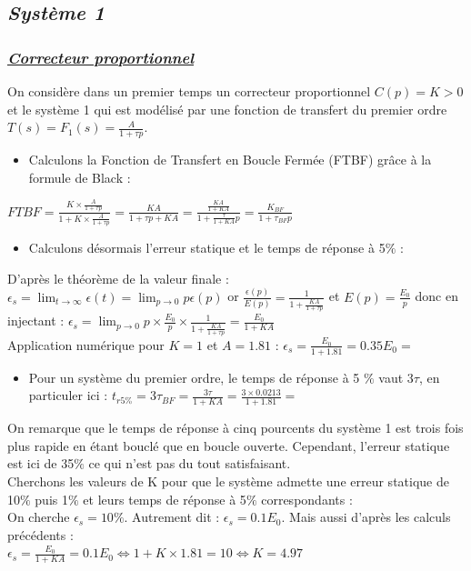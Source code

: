 \documentclass[12pt]{article}
\begin{document}
\subsection{\itshape Système 1}
\subsubsection{\underline{\itshape \bf Correcteur proportionnel}}
On considère dans un premier temps un correcteur proportionnel $C(p) = K > 0$ et le système 1 qui est modélisé par une fonction de transfert du premier ordre $T(s) = F_1(s) = \frac{A}{1 + \tau p}$.
\\
\begin{itemize}
    \item Calculons la Fonction de Transfert en Boucle Fermée (FTBF) grâce à la formule de Black : 
\end{itemize}

\large $FTBF = \frac{K\times \frac{A}{1 + \tau p}}{1 + K\times \frac{A}{1 + \tau p}} = \frac{KA}{1 + \tau p + KA} = \frac{\frac{KA}{1 + KA}}{1 + \frac{\tau}{1 + KA}p} = \frac{K_{BF}}{1 + \tau_{BF}p}$
\begin{itemize}
    \item \normalsize Calculons désormais l'erreur statique et le temps de réponse à 5$\%$ : 
\end{itemize}
\normalsize D'après le théorème de la valeur finale : 
\\
\large $\epsilon_s = \lim_{t \to \infty} \epsilon(t) = \lim_{p \to 0}p\epsilon(p)$
\normalsize or \large $\frac{\epsilon(p)}{E(p)} = \frac{1}{1 + \frac{KA}{1 + \tau p}}$ et $E(p) = \frac{E_0}{p}$ \normalsize donc en injectant :
\large$\epsilon_s = \lim_{p \to 0}p\times \frac{E_0}{p}\times \frac{1}{1 + \frac{KA}{1 + \tau p}} = \frac{E_0}{1 + KA}$
\\ \normalsize Application numérique pour $K=1$ et $A = 1.81$ :  $\epsilon_s =\frac{E_0}{1 + 1.81} = 0.35E_0 =$ 
\\
\begin{itemize}
    \item Pour un système du premier ordre, le temps de réponse à 5 $\%$ vaut $3\tau$, en particuler ici : $t_{r5\%} = 3\tau_{BF} = \frac{3\tau}{1 + KA} = \frac{3\times0.0213}{1 + 1.81} =$ 
\end{itemize}
On remarque que le temps de réponse à cinq pourcents du système  1 est trois fois plus rapide en étant bouclé que en boucle ouverte. Cependant, l'erreur statique est ici de 35$\%$ ce qui n'est pas du tout satisfaisant. 
\\Cherchons les valeurs de K pour que le système admette une erreur statique de 10$\%$ puis 1$\%$ et leurs temps de réponse à 5$\%$ correspondants : 
\\On cherche $\epsilon_s = 10\%$. Autrement dit : $\epsilon_s = 0.1E_0$. Mais aussi d'après les calculs précédents : 
\\$\epsilon_s = \frac{E_0}{1 + KA} = 0.1E_0 \Leftrightarrow 1 + K\times 1.81 = 10 \Leftrightarrow K = 4.97$
\end{document}
